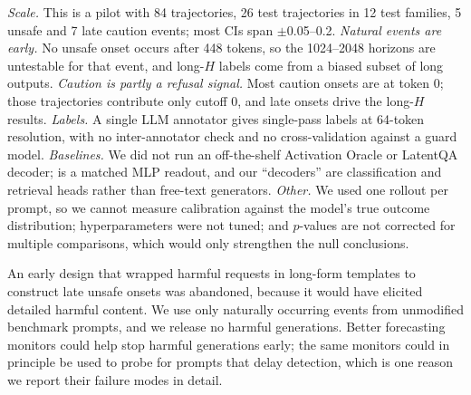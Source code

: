 \emph{Scale.} This is a pilot with 84 trajectories, 26 test trajectories in 12 test families, 5 unsafe and 7 late caution events; most CIs span $\pm$0.05--0.2.
\emph{Natural events are early.} No unsafe onset occurs after 448 tokens, so the 1024--2048 horizons are untestable for that event, and long-$H$ labels come from a biased subset of long \longwriter outputs.
\emph{Caution is partly a refusal signal.} Most caution onsets are at token 0; those trajectories contribute only cutoff 0, and late onsets drive the long-$H$ results.
\emph{Labels.} A single LLM annotator gives single-pass labels at 64-token resolution, with no inter-annotator check and no cross-validation against a guard model.
\emph{Baselines.} We did not run an off-the-shelf Activation Oracle or LatentQA decoder; \directao is a matched MLP readout, and our ``decoders'' are classification and retrieval heads rather than free-text generators.
\emph{Other.} We used one rollout per prompt, so we cannot measure calibration against the model's true outcome distribution; hyperparameters were not tuned; and $p$-values are not corrected for multiple comparisons, which would only strengthen the null conclusions.

An early design that wrapped harmful requests in long-form templates to construct late unsafe onsets was abandoned, because it would have elicited detailed harmful content.
We use only naturally occurring events from unmodified benchmark prompts, and we release no harmful generations.
Better forecasting monitors could help stop harmful generations early; the same monitors could in principle be used to probe for prompts that delay detection, which is one reason we report their failure modes in detail.

